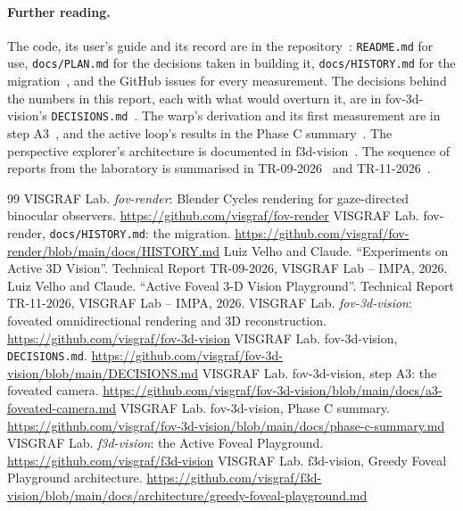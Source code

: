 \documentclass[11pt,a4paper]{article}
\newcommand{\code}[1]{\texttt{\small #1}}
\begin{document}
\paragraph{Further reading.} The code, its user's guide and its record are in the repository~\cite{fovrender}:
\code{README.md} for use, \code{docs/PLAN.md} for the decisions taken in building it, \code{docs/HISTORY.md} for
the migration~\cite{fovrenderHist}, and the GitHub issues for every measurement. The decisions behind the
numbers in this report, each with what would overturn it, are in fov-3d-vision's
\code{DECISIONS.md}~\cite{fov3dDec}. The warp's derivation and its first measurement are
in step A3~\cite{fov3dA3}, and the active loop's results in the Phase C summary~\cite{fov3dC}. The perspective
explorer's architecture is documented in f3d-vision~\cite{f3dArch}. The sequence of reports from the laboratory
is summarised in TR-09-2026~\cite{tr09} and TR-11-2026~\cite{tr11}.

\begin{thebibliography}{99}
 VISGRAF Lab. \emph{fov-render}: Blender Cycles rendering for gaze-directed binocular
  observers. \url{https://github.com/visgraf/fov-render}
 VISGRAF Lab. fov-render, \code{docs/HISTORY.md}: the migration.
  \url{https://github.com/visgraf/fov-render/blob/main/docs/HISTORY.md}
 Luiz Velho and Claude. ``Experiments on Active 3D Vision''. Technical Report TR-09-2026, VISGRAF
  Lab -- IMPA, 2026.
 Luiz Velho and Claude. ``Active Foveal 3-D Vision Playground''. Technical Report TR-11-2026,
  VISGRAF Lab -- IMPA, 2026.
 VISGRAF Lab. \emph{fov-3d-vision}: foveated omnidirectional rendering and 3D reconstruction.
  \url{https://github.com/visgraf/fov-3d-vision}
 VISGRAF Lab. fov-3d-vision, \code{DECISIONS.md}.
  \url{https://github.com/visgraf/fov-3d-vision/blob/main/DECISIONS.md}
 VISGRAF Lab. fov-3d-vision, step A3: the foveated camera.
  \url{https://github.com/visgraf/fov-3d-vision/blob/main/docs/a3-foveated-camera.md}
 VISGRAF Lab. fov-3d-vision, Phase C summary.
  \url{https://github.com/visgraf/fov-3d-vision/blob/main/docs/phase-c-summary.md}
 VISGRAF Lab. \emph{f3d-vision}: the Active Foveal Playground.
  \url{https://github.com/visgraf/f3d-vision}
 VISGRAF Lab. f3d-vision, Greedy Foveal Playground architecture.
  \url{https://github.com/visgraf/f3d-vision/blob/main/docs/architecture/greedy-foveal-playground.md}
\end{thebibliography}
\end{document}
